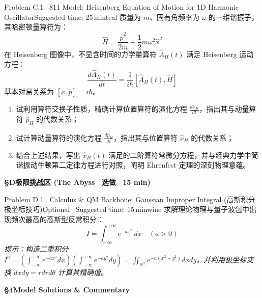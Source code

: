 \documentclass[a4paper,11pt]{article}
\begin{document}
\begin{problembox}{Problem C.1 \textbar\ 811 Model: Heisenberg Equation of Motion for 1D Harmonic Oscillator}{Suggested time: 25\,min}{teal}
质量为 $m$、固有角频率为 $\omega$ 的一维谐振子，其哈密顿量算符为：
\[
  \hat{H} = \frac{\hat{p}^2}{2m} + \frac{1}{2}m\omega^2 \hat{x}^2
\]
在 Heisenberg 图像中，不显含时间的力学量算符 $\hat{A}_H(t)$ 满足 Heisenberg 运动方程：
\[
  \frac{d\hat{A}_H(t)}{dt} = \frac{1}{i\hbar}[\hat{A}_H(t), \hat{H}]
\]
基本对易关系为 $[\hat{x}, \hat{p}] = i\hbar$。
\begin{enumerate}[leftmargin=1.8em, itemsep=2pt, topsep=1pt]
  \item 试利用算符交换子性质，精确计算位置算符的演化方程 $\frac{d\hat{x}_H}{dt}$，指出其与动量算符 $\hat{p}_H$ 的代数关系；
  \item 试计算动量算符的演化方程 $\frac{d\hat{p}_H}{dt}$，指出其与位置算符 $\hat{x}_H$ 的代数关系；
  \item 结合上述结果，写出 $\hat{x}_H(t)$ 满足的二阶算符常微分方程，并与经典力学中简谐振动牛顿第二定律方程进行对照，阐明 Ehrenfest 定理的深刻物理意蕴。
\end{enumerate}
\end{problembox}

\vspace{10pt}

{\normalsize\sffamily\bfseries\color{wine} \S D\quad 极限挑战区 (The Abyss \textperiodcentered\ 选做 \textperiodcentered\ 15 min)}
\vspace{3pt}

\begin{problembox}{Problem D.1 \textbar\ Calculus \& QM Backbone: Gaussian Improper Integral (高斯积分极坐标技巧)}{Optional \textperiodcentered\ Suggested time: 15\,min}{wine}
求解理论物理与量子波包中出现频次最高的高斯型反常积分：
\[
  I = \int_{-\infty}^{+\infty} e^{-a x^2}\,dx \quad (a > 0)
\]
\textit{提示：构造二重积分 $I^2 = \left(\int_{-\infty}^{+\infty} e^{-ax^2}dx\right)\left(\int_{-\infty}^{+\infty} e^{-ay^2}dy\right) = \iint_{\mathbb{R}^2} e^{-a(x^2+y^2)}dxdy$，并利用极坐标变换 $dxdy = rdrd\theta$ 计算其精确值。}
\end{problembox}

\clearpage

{\Large\sffamily\bfseries\color{navy} \S 4\quad Model Solutions \& Commentary}
\end{document}
